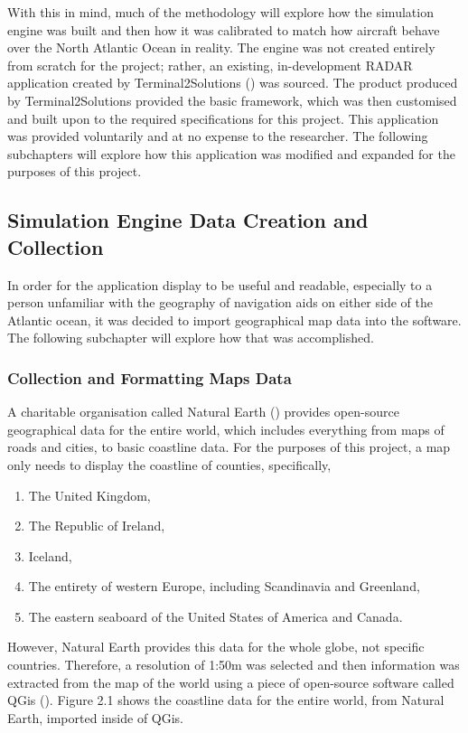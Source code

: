 \documentclass[stu, a4paper, 12pt, floatsintext]{apa7}
\numberwithin{figure}{section}
\numberwithin{table}{section}
\numberwithin{equation}{section}
\begin{document}
With this in mind, much of the methodology will explore how the simulation engine was built and then how it was calibrated to match how aircraft behave over the North Atlantic Ocean in reality. The engine was not created entirely from scratch for the project; rather, an existing, in-development RADAR application created by Terminal2Solutions (\cite{T2}) was sourced. The product produced by Terminal2Solutions provided the basic framework, which was then customised and built upon to the required specifications for this project. This application was provided voluntarily and at no expense to the researcher. The following subchapters will explore how this application was modified and expanded for the purposes of this project.   
\subsection{Simulation Engine Data Creation and Collection}
In order for the application display to be useful and readable, especially to a person unfamiliar with the geography of navigation aids on either side of the Atlantic ocean, it was decided to import geographical map data into the software. The following subchapter will explore how that was accomplished.
\subsubsection{Collection and Formatting Maps Data}
A charitable organisation called Natural Earth (\cite{NaturalEarth}) provides open-source geographical data for the entire world, which includes everything from maps of roads and cities, to basic coastline data. For the purposes of this project, a map only needs to display the coastline of counties, specifically,
\begin{enumerate}
    \item The United Kingdom,
    \item The Republic of Ireland,
    \item Iceland,
    \item The entirety of western Europe, including Scandinavia and Greenland,
    \item The eastern seaboard of the United States of America and Canada. 
\end{enumerate}
However, Natural Earth provides this data for the whole globe, not specific countries. Therefore, a resolution of 1:50m was selected and then information was extracted from the map of the world using a piece of open-source software called QGis (\cite{QGIS}). Figure 2.1 shows the coastline data for the entire world, from Natural Earth, imported inside of QGis. 
\end{document}
